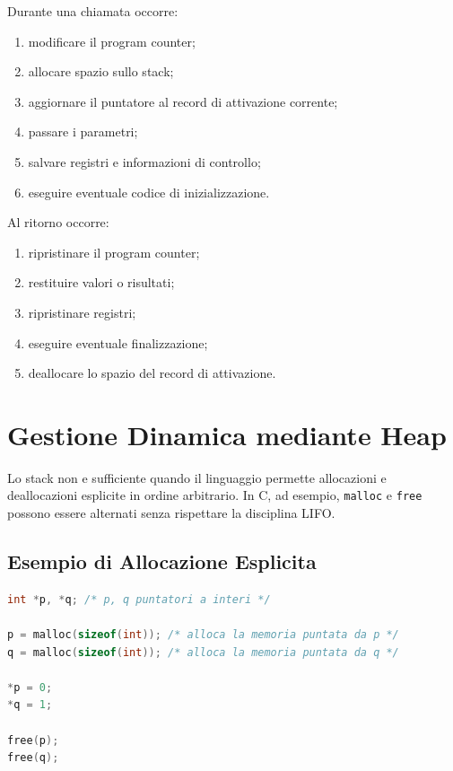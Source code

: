 \documentclass{article}
\begin{document}
Durante una chiamata occorre:

\begin{enumerate}
  \item modificare il program counter;
  \item allocare spazio sullo stack;
  \item aggiornare il puntatore al record di attivazione corrente;
  \item passare i parametri;
  \item salvare registri e informazioni di controllo;
  \item eseguire eventuale codice di inizializzazione.
\end{enumerate}

Al ritorno occorre:

\begin{enumerate}
  \item ripristinare il program counter;
  \item restituire valori o risultati;
  \item ripristinare registri;
  \item eseguire eventuale finalizzazione;
  \item deallocare lo spazio del record di attivazione.
\end{enumerate}

\section{Gestione Dinamica mediante Heap}

Lo stack non e sufficiente quando il linguaggio permette allocazioni e deallocazioni esplicite in ordine arbitrario. In C, ad esempio, \texttt{malloc} e \texttt{free} possono essere alternati senza rispettare la disciplina LIFO.

\subsection{Esempio di Allocazione Esplicita}

\begin{lstlisting}[language=C]
int *p, *q; /* p, q puntatori a interi */

p = malloc(sizeof(int)); /* alloca la memoria puntata da p */
q = malloc(sizeof(int)); /* alloca la memoria puntata da q */

*p = 0;
*q = 1;

free(p);
free(q);
\end{lstlisting}
\end{document}
